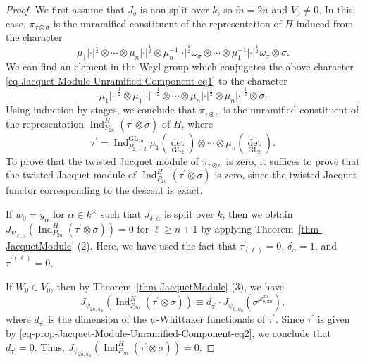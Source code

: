 \documentclass[12pt]{amsart}
\newcommand{\wt}{\widetilde}
\theoremstyle{remark}
\DeclareMathOperator{\Ind}{Ind}
\DeclareMathOperator{\GL}{GL}
\begin{document}
\begin{proof}
 We first assume that $J_{\delta}$ is non-split over $k$, so $\wt m=2n$ and $V_0\not=0$. In this case,  $\pi_{\tau\otimes \sigma}$ is the unramified constituent of the representation of $H$ induced from the character 
\begin{equation}
\label{eq-Jacquet-Module-Unramified-Component-eq1}
 \mu_1|\cdot|^{\frac{1}{2}}\otimes\cdots \otimes\mu_n|\cdot|^{\frac{1}{2}}\otimes \mu_n^{-1}|\cdot|^{\frac{1}{2}}\omega_{\sigma} \otimes \cdots \otimes   \mu_1^{-1}|\cdot|^{\frac{1}{2}}\omega_{\sigma}\otimes \sigma.
 \end{equation}
We can find an element in the Weyl group which conjugates the above character \eqref{eq-Jacquet-Module-Unramified-Component-eq1} to the character
\begin{equation*}
 \mu_1|\cdot|^{\frac{1}{2}}\otimes   \mu_1|\cdot|^{-\frac{1}{2}}  \otimes  \cdots \otimes\mu_n|\cdot|^{\frac{1}{2}}\otimes  \mu_n|\cdot|^{\frac{1}{2}}  \otimes    \sigma.
\end{equation*}
Using induction by stages, we conclude that $\pi_{\tau\otimes \sigma}$ is the unramified constituent of the representation $\Ind_{P_{2n}}^{H}(\tau^\prime \otimes \sigma)$ of $H$, where
\begin{equation}
\label{eq-prop-Jacquet-Module-Unramified-Component-eq2}
	\tau^\prime= \Ind_{P_{2, \cdots, 2}}^{\GL_{2n}} \mu_1 ({\det}_{\GL_2}) \otimes \cdots \otimes \mu_n ({\det}_{\GL_2})  .
\end{equation}
To prove that the twisted Jacquet module of $\pi_{\tau\otimes \sigma}$ is zero, it suffices to prove that the twisted Jacquet module of $\Ind_{P_{2n}}^{H}(\tau^\prime \otimes \sigma)$ is zero, since the twisted Jacquet functor corresponding to the descent is exact. 


If $w_0=y_{\alpha}$ for $\alpha\in k^\times$ such that  $J_{\delta,\alpha}$ is split over $k$, then we obtain $J_{\psi_{\ell,\alpha}}(\Ind_{P_{2n}}^{H}(\tau^\prime \otimes \sigma))=0$ for $\ell\ge n+1$ by applying Theorem~\ref{thm-JacquetModule} (2). Here, we have used the fact that $\tau^\prime_{(\ell)}=0$, $\delta_{\alpha}=1$, and 
${\tau^{\prime}}^{(\ell)}=0$.


If $W_0\in V_0$, then by Theorem~\ref{thm-JacquetModule} (3), we have 
\begin{equation*}
	J_{\psi_{{2n},w_0}}(\Ind_{P_{2n}}^{H}(\tau^\prime \otimes \sigma))\equiv d_{\tau^\prime}\cdot  J_{\psi_{0,w_0}}( \sigma^{\omega_{b,{2n}}^{2n}}),
\end{equation*}
where $d_{\tau^\prime}$ is the dimension of the $\psi$-Whittaker functionals of $\tau^\prime$. Since $\tau^\prime$ is given by \eqref{eq-prop-Jacquet-Module-Unramified-Component-eq2}, we conclude that $d_{\tau^\prime}=0$. Thus, $J_{\psi_{{2n},w_0}}(\Ind_{P_{2n}}^{H}(\tau^\prime \otimes \sigma))=0$. 


\end{proof}
\end{document}

